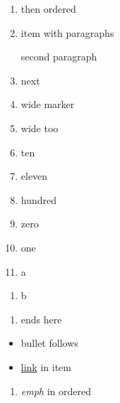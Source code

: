 \begin{enumerate}
\def\labelenumi{\arabic{enumi}.}
\item
  then ordered
\item
  item with paragraphs

  second paragraph
\item
  next
\item
  wide marker
\item
  wide too
\item
  ten
\item
  eleven
\item
  hundred
\item
  zero
\item
  one
\item
  a
\end{enumerate}

\begin{enumerate}
\def\labelenumi{\arabic{enumi})}
\setcounter{enumi}{1}
\tightlist
\item
  b
\end{enumerate}

\begin{enumerate}
\def\labelenumi{\arabic{enumi}.}
\tightlist
\item
  ends here
\end{enumerate}

\begin{itemize}
\item
  bullet follows
\item
  \href{http://example.com}{link} in item
\end{itemize}

\begin{enumerate}
\def\labelenumi{\arabic{enumi}.}
\tightlist
\item
  \emph{emph} in ordered
\end{enumerate}
